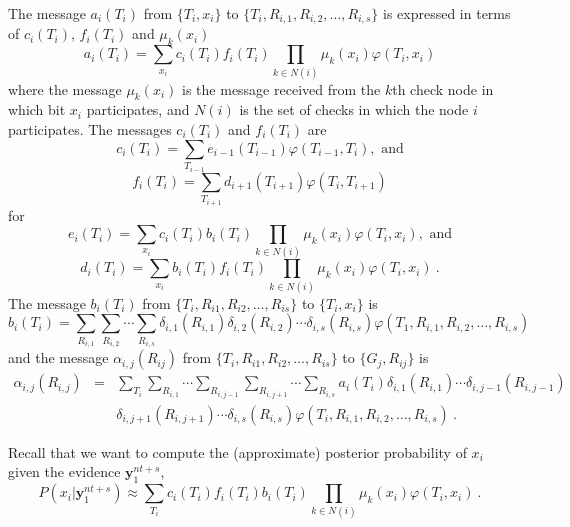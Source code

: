 The message $a_i(T_i)$ from $\{T_{i},x_i\}$ to $\{T_i,
R_{i,1},R_{i,2},\dots, R_{i,s}\}$ is expressed in terms of
$c_i(T_i)$, $f_i(T_i)$ and $\mu_k(x_i)$
\begin{equation}
a_i(T_i)=\sum_{x_i}c_i(T_i)f_i(T_i) \prod_{k \in N(i)} \mu_k(x_i)
\varphi(T_i,x_i)
\end{equation}
where the message $\mu_k(x_i)$ is the message received from the
$k$th check node in which bit $x_i$ participates, and $N(i)$ is the
set of checks in which the node $i$ participates. The messages
$c_i(T_i)$ and $f_i(T_i)$ are
\begin{equation}
c_i(T_i)=\sum_{T_{i-1}}e_{i-1}(T_{i-1})\varphi(T_{i-1},T_{i}),
\text{ and}
\end{equation}
\begin{equation}
f_i(T_i)=\sum_{T_{i+1}}d_{i+1}(T_{i+1})\varphi(T_{i},T_{i+1})
\end{equation}
for
\begin{equation}
e_i(T_i)=\sum_{x_i}c_i(T_i)b_i(T_i) \prod_{k \in N(i)}
\mu_k(x_i)\varphi(T_i,x_i), \text{ and}
\end{equation}
\begin{equation}
d_i(T_i)=\sum_{x_i}b_i(T_i)f_i(T_i) \prod_{k \in N(i)} \mu_k(x_i)
\varphi(T_i,x_i)~.
\end{equation}
The message $b_i(T_i)$ from $\{T_i, R_{i1},R_{i2},\dots,R_{is}\}$ to
$\{T_i,x_i\}$ is
\begin{equation}
b_i(T_i)=\sum_{R_{i,1}}\sum_{R_{i,2}}\cdots\sum_{R_{i,s}}
\delta_{i,1}(R_{i,1})\delta_{i,2}(R_{i,2})\cdots\delta_{i,s}(R_{i,s})
\varphi(T_1,R_{i,1},R_{i,2},\dots,R_{i,s})
\end{equation}
and the message $\alpha_{i,j}(R_{ij})$ from $\{T_i,
R_{i1},R_{i2},\dots,R_{is}\}$ to $\{G_j,R_{ij}\}$ is
\begin{equation}\begin{array}{lll}
\alpha_{i,j}(R_{i,j})&=&\sum_{T_i}\sum_{R_{i,1}}\cdots\sum_{R_{i,j-1}}\sum_{R_{i,j+1}}\cdots\sum_{R_{i,s}}
a_i(T_i)\delta_{i,1}(R_{i,1})\cdots\delta_{i,j-1}(R_{i,j-1})\\
{}&{}&\delta_{i,j+1}(R_{i,j+1})\cdots\delta_{i,s}(R_{i,s})
\varphi(T_i,R_{i,1},R_{i,2},\dots,R_{i,s})~.
\end{array}\end{equation}


Recall that we want to compute the (approximate) posterior
probability of $x_i$ given the evidence $\mathbf{y}_1^{nt+s}$,
\begin{equation}
P(x_i|\mathbf{y}_1^{nt+s}) \approx \sum_{T_i}
c_i(T_i)f_i(T_i)b_i(T_i)\prod_{k \in N(i)} \mu_k(x_i)
\varphi(T_i,x_i)~.
\end{equation}

